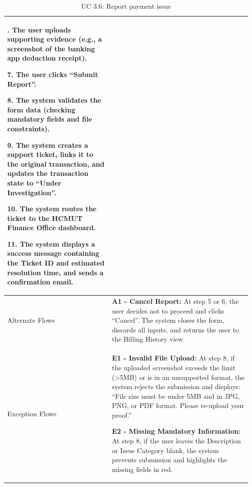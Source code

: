 \begin{table}[H]
\begin{tabularx}{\textwidth}{|>{\raggedright\arraybackslash}p{3.5cm}|>{\RaggedRight\arraybackslash}X|}
6. The user uploads supporting evidence (e.g., a screenshot of the banking app deduction receipt). \par
7. The user clicks ``Submit Report''. \par
8. The system validates the form data (checking mandatory fields and file constraints). \par
9. The system creates a support ticket, links it to the original transaction, and updates the transaction state to ``Under Investigation''. \par
10. The system routes the ticket to the HCMUT Finance Office dashboard. \par
11. The system displays a success message containing the Ticket ID and estimated resolution time, and sends a confirmation email. \\
\hline
Alternate Flows & 
\textbf{A1 - Cancel Report:} At step 5 or 6, the user decides not to proceed and clicks ``Cancel''. The system closes the form, discards all inputs, and returns the user to the Billing History view. \\
\hline
Exception Flows & 
\textbf{E1 - Invalid File Upload:} At step 8, if the uploaded screenshot exceeds the limit (>5MB) or is in an unsupported format, the system rejects the submission and displays: ``File size must be under 5MB and in JPG, PNG, or PDF format. Please re-upload your proof.'' \par \vspace{0.5em}
\textbf{E2 - Missing Mandatory Information:} At step 8, if the user leaves the Description or Issue Category blank, the system prevents submission and highlights the missing fields in red. \\
\hline
\end{tabularx}
\caption{UC 3.6: Report payment issue}
\label{tab:uc3.6}
\end{table}